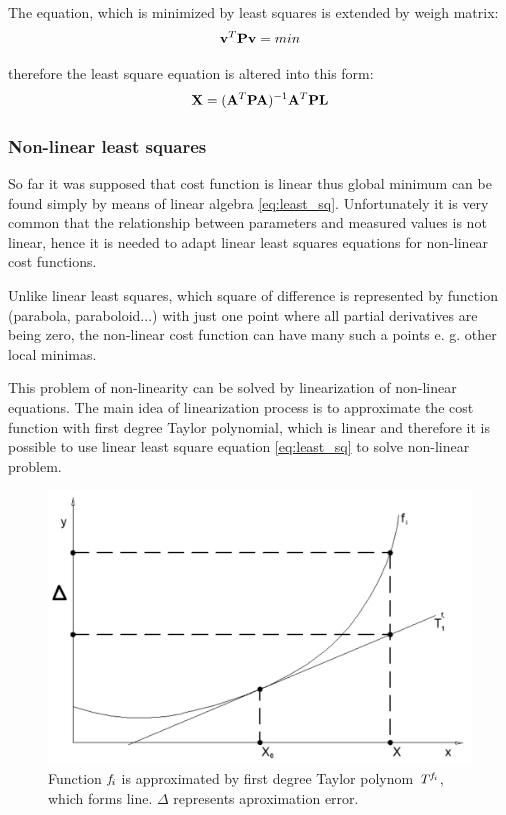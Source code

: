 \documentclass[a4paper,12pt]{article}
\newcommand{\ematr}[1]{
{\bf #1}
}
\newcommand{\evect}[1]{
{\bf #1}
}
\newcommand{\efunc}[1]{
{\it #1}
}
\begin{document}
The equation, which is minimized by least squares is extended by weigh matrix:
\begin{equation}
\evect{v}^{T}  \ematr{P} \evect{v} = min
\end{equation}

therefore the least square equation is altered into this form:
\begin{equation}
\label{eq:least_sq}
\evect{X} = (\ematr{A}^{T} \ematr{P} \ematr{A})^{-1} \ematr{A}^{T} \ematr{P} \ematr{L}
\end{equation}

\subsubsection{Non-linear least squares}
\label{sec:non_least}
So far it was supposed that cost function is linear thus global minimum can be found simply by means of linear algebra  \eqref{eq:least_sq}.
Unfortunately it is very common that the relationship between parameters and 
measured values is not linear, hence it is needed to adapt linear least squares equations for non-linear
cost functions.

Unlike linear least squares, which square of difference \label{eq:least_be_part}
is represented by function  (parabola, paraboloid...) with just one point where all
partial derivatives are being zero, the non-linear cost function can have many such a points e. g. other local minimas. 

This problem of non-linearity can be solved by linearization of non-linear equations.
The main idea of linearization process is to approximate the cost function with first degree Taylor polynomial,
which is linear and therefore it is possible to use linear least square equation \eqref{eq:least_sq} 
to solve non-linear problem. 

\begin{figure}[h]
    \centering
    \includegraphics[scale=0.2]{figures/taylor.png}
    \caption{Function $\efunc{f}_{i}$ is approximated by first degree Taylor polynom $\efunc{T} ^{\efunc{f}_{i}}$,
    which forms line. $\Delta$ represents aproximation error.}
    \label{fig:taylor}
\end{figure}
\end{document}
